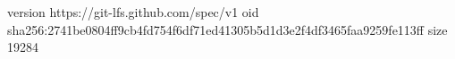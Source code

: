 version https://git-lfs.github.com/spec/v1
oid sha256:2741be0804ff9cb4fd754f6df71ed41305b5d1d3e2f4df3465faa9259fe113ff
size 19284
